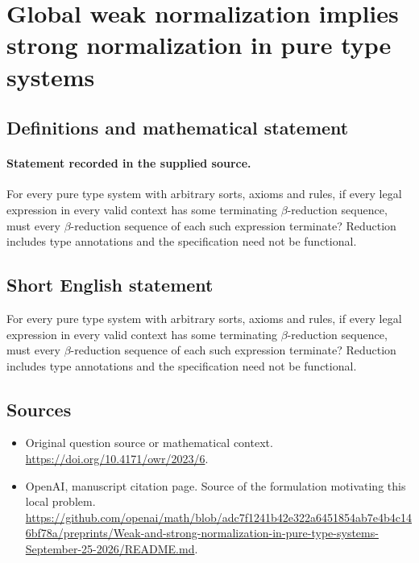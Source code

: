 \documentclass[11pt]{article}
\begin{document}
\section*{Global weak normalization implies strong normalization in pure type systems}\label{30007205}
\subsection{Definitions and mathematical statement}
\paragraph{Statement recorded in the supplied source.}
For every pure type system with arbitrary sorts, axioms and rules, if every legal expression in every valid context has some terminating $\beta$-reduction sequence, must every $\beta$-reduction sequence of each such expression terminate? Reduction includes type annotations and the specification need not be functional.
\subsection{Short English statement}
For every pure type system with arbitrary sorts, axioms and rules, if every legal expression in every valid context has some terminating $\beta$-reduction sequence, must every $\beta$-reduction sequence of each such expression terminate? Reduction includes type annotations and the specification need not be functional.
\subsection{Sources}
\begin{itemize}
\item[S1] Original question source or mathematical context.
\url{https://doi.org/10.4171/owr/2023/6}.
\item[S2] OpenAI, manuscript citation page. Source of the formulation motivating this local problem.
\url{https://github.com/openai/math/blob/adc7f1241b42e322a6451854ab7e4b4c146bf78a/preprints/Weak-and-strong-normalization-in-pure-type-systems-September-25-2026/README.md}.
\end{itemize}
\end{document}
